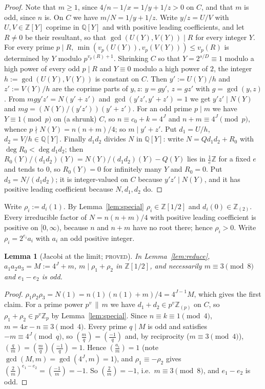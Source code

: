 \documentclass[11pt,reqno]{amsart}
\newtheorem{lemma}[theorem]{Lemma}
\theoremstyle{definition}
\newcommand{\Z}{\mathbb Z}
\newcommand{\Q}{\mathbb Q}
\newcommand{\leg}[2]{\left(\frac{#1}{#2}\right)}
\newcommand{\status}[1]{\textup{\textsc{#1}}}
\begin{document}
\begin{proof}
Note that $m\ge1$, since $4/n-1/x=1/y+1/z>0$ on $C$, and that $m$ is odd,
since $n$ is.  On $C$ we have
$m/N=1/y+1/z$.  Write $y/z=U/V$ with $U,V\in\Z[Y]$ coprime in $\Q[Y]$ and
with positive leading coefficients, and let $R\ne0$ be their resultant, so
that $\gcd(U(Y),V(Y))\mid R$ for every integer $Y$.  For every prime
$p\mid R$, $\min(v_p(U(Y)),v_p(V(Y)))\le v_p(R)$ is determined by $Y$ modulo
$p^{v_p(R)+1}$.  Shrinking $C$ so that $Y=2^{s/D}\equiv1$ modulo a high power
of every odd $p\mid R$ and $Y\equiv0$ modulo a high power of $2$, the integer
$h:=\gcd(U(Y),V(Y))$ is constant on $C$.  Then $y':=U(Y)/h$ and
$z':=V(Y)/h$ are the coprime parts of $y,z$: $y=gy'$, $z=gz'$ with
$g=\gcd(y,z)$.  From $mgy'z'=N(y'+z')$ and $\gcd(y'z',y'+z')=1$ we get
$y'z'\mid N(Y)$ and $mg=(N(Y)/(y'z'))(y'+z')$.  For an odd prime $p\mid m$
we have $Y\equiv1\pmod p$ on (a shrunk) $C$, so $n\equiv c_0+k=4^J$ and
$n+m\equiv4^J\pmod p$, whence $p\nmid N(Y)=n(n+m)/4$; so $m\mid y'+z'$.
Put $d_1=U/h$, $d_2=V/h\in\Q[Y]$.  Finally $d_1d_2$ divides $N$ in $\Q[Y]$:
write $N=Qd_1d_2+R_0$ with $\deg R_0<\deg d_1d_2$; then
$R_0(Y)/(d_1d_2)(Y)=N(Y)/(d_1d_2)(Y)-Q(Y)$ lies in $\frac1e\Z$ for a fixed $e$
and tends to $0$, so $R_0(Y)=0$ for infinitely many $Y$ and $R_0=0$.  Put
$d_3=N/(d_1d_2)$; it is integer-valued on $C$ because $y'z'\mid N(Y)$, and
it has positive leading coefficient because $N,d_1,d_2$ do.
\end{proof}

Write $\rho_i:=d_i(1)$.  By Lemma~\ref{lem:special} $\rho_i\in\Z[1/2]$ and
$d_i(0)\in\Z_{(2)}$.  Every irreducible factor of $N=n(n+m)/4$ with positive
leading coefficient is positive on $[0,\infty)$, because $n$ and $n+m$ have
no root there; hence $\rho_i>0$.  Write $\rho_i=2^{e_i}a_i$ with $a_i$ an odd
positive integer.

\begin{lemma}[Jacobi at the limit; \status{proved}]\label{lem:limitjacobi}
In Lemma~\ref{lem:reduce}, $a_1a_2a_3=M:=4^J+m$, $m\mid\rho_1+\rho_2$ in
$\Z[1/2]$, and necessarily $m\equiv3\pmod8$ and $e_1-e_2$ is odd.
\end{lemma}

\begin{proof}
$\rho_1\rho_2\rho_3=N(1)=n(1)(n(1)+m)/4=4^{J-1}M$, which gives the first
claim.  For a prime power $p^v\,\|\,m$ we have $d_1+d_2\in p^v\Z_{(p)}$ on
$C$, so $\rho_1+\rho_2\in p^v\Z_p$ by Lemma~\ref{lem:special}.  Since
$n\equiv k\equiv1\pmod4$, $m=4x-n\equiv3\pmod4$.  Every prime $q\mid M$ is odd
and satisfies $-m\equiv4^J\pmod q$, so $\leg mq=\leg{-1}q$ and, by
reciprocity ($m\equiv3\pmod4$), $\leg qm=\leg mq\leg{-1}q=1$.  Hence
$\leg{a_i}m=1$ (note $\gcd(M,m)=\gcd(4^J,m)=1$), and $\rho_1\equiv-\rho_2$
gives $\leg2m^{e_1-e_2}=\leg{-1}m=-1$.  So $\leg2m=-1$, i.e.\ $m\equiv3\pmod
8$, and $e_1-e_2$ is odd.
\end{proof}
\end{document}
